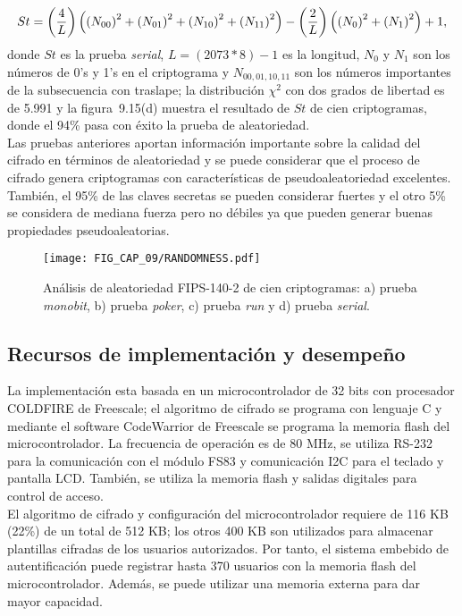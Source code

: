 \begin{equation}
St=\left(4 \over L\right) \left( \left(N_{00}\right)^{2}+\left(N_{01}\right)^{2}+\left(N_{10}\right)^{2}+\left(N_{11}\right)^{2}\right)-\left(2 \over L\right) \left(\left(N_{0}\right)^{2}+\left(N_{1}\right)^{2}\right)+1,
\end{equation}
donde $St$ es la prueba \textit{serial}, $L=\left(2073\ast 8\right)-1$ es la longitud, $N_{0}$ y $N_{1}$ son los números de 0's y 1's en el criptograma y $N_{00,01,10,11}$ son los números importantes de la subsecuencia con traslape; la distribución $\chi^{2}$ con dos grados de libertad es de 5.991 y la figura~9.15(d) muestra el resultado de $St$ de cien criptogramas, donde el 94\% pasa con éxito la prueba de aleatoriedad. \\

Las pruebas anteriores aportan información importante sobre la calidad del cifrado en términos de aleatoriedad y se puede considerar que el proceso de cifrado genera criptogramas con características de pseudoaleatoriedad excelentes. También, el 95\% de las claves secretas se pueden considerar fuertes y el otro 5\% se considera de mediana fuerza pero no débiles ya que pueden generar buenas propiedades pseudoaleatorias.    
       
\begin{figure}[!htbp] %
	\center
	\texttt{[image: FIG\_CAP\_09/RANDOMNESS.pdf]}     
	\caption{Análisis de aleatoriedad FIPS-140-2 de cien criptogramas: a) prueba \textit{monobit}, b) prueba \textit{poker}, c) prueba \textit{run} y d) prueba \textit{serial}.}
\end{figure}

\subsection{Recursos de implementación y desempeño}
La implementación esta basada en un microcontrolador de 32 bits con procesador COLDFIRE de Freescale; el algoritmo de cifrado se programa con lenguaje C y mediante el software CodeWarrior de Freescale se programa la memoria flash del microcontrolador. La frecuencia de operación es de 80 MHz, se utiliza RS-232 para la comunicación con el módulo FS83 y comunicación I2C para el teclado y pantalla LCD. También, se utiliza la memoria flash y salidas digitales para control de acceso.  \\

El algoritmo de cifrado y configuración del microcontrolador requiere de 116 KB (22\%) de un total de 512 KB; los otros 400 KB son utilizados para almacenar plantillas cifradas de los usuarios autorizados. Por tanto, el sistema embebido de autentificación puede registrar hasta 370 usuarios con la memoria flash del microcontrolador. Además, se puede utilizar una memoria externa para dar mayor capacidad. \\

